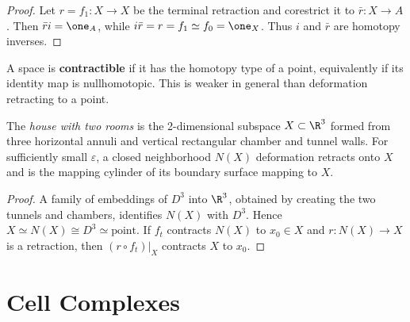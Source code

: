 \begin{proof}

\sketch Let $r=f_1:X\to X$ be the terminal retraction and corestrict it to
$\bar r:X\to A$. Then $\bar r i=\one_A$, while $i\bar r=r=f_1\simeq f_0=\one_X$.
Thus $i$ and $\bar r$ are homotopy inverses.
\end{proof}

\begin{definition}
\label{def:contractible}





A space is \textbf{contractible} if it has the homotopy type of a point, equivalently
if its identity map is nullhomotopic. This is weaker in general than deformation
retracting to a point.
\end{definition}

\begin{example}
\label{ex:house-with-two-rooms-contractible}

The \textit{house with two rooms} is the 2-dimensional subspace $X\subset\R^3$
formed from three horizontal annuli and vertical rectangular chamber and tunnel walls.
For sufficiently small $\varepsilon$, a closed neighborhood $N(X)$ deformation retracts
onto $X$ and is the mapping cylinder of its boundary surface mapping to $X$.
\end{example}

\begin{proof}
\sketch A family of embeddings of $D^3$ into $\R^3$, obtained by creating the two
tunnels and chambers, identifies $N(X)$ with $D^3$. Hence
$X\simeq N(X)\cong D^3\simeq\text{point}$. If $f_t$ contracts $N(X)$ to
$x_0\in X$ and $r:N(X)\to X$ is a retraction, then $(r\circ f_t)|_X$ contracts
$X$ to $x_0$.
\end{proof}

\section{Cell Complexes}
\label{sec:cell-complexes}

